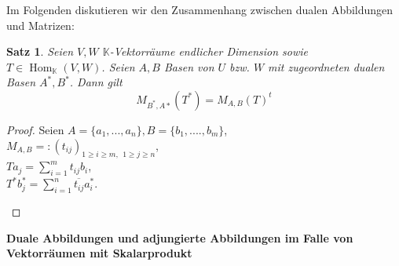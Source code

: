 \documentclass[12pt,a4paper]{article}
\newtheorem{theorem}{Satz}
\theoremstyle{definition}
\theoremstyle{remark}
\renewcommand{\bar}[1]{\overline{#1}}
\DeclareMathOperator{\Hom}{Hom}
\begin{document}
	Im Folgenden diskutieren wir den Zusammenhang zwischen dualen Abbildungen und Matrizen:
	\begin{theorem}
		Seien $V,W$ $\mathbb{K}$-Vektorräume endlicher Dimension sowie $T \in \Hom_{\mathbb{K}}(V,W)$. Seien $A,B$ Basen von $U$ bzw. $W$ mit zugeordneten dualen Basen $A^*, B^*$. Dann gilt
		\begin{equation}
			M_{B^*,A*}(T^*) = M_{A,B}(T)^t
		\end{equation}		 
	\end{theorem}
	\begin{proof}
		Seien $A = \{ a_1,...,a_n \}, B = \{ b_1,....,b_m \}$, \\
		 $M_{A,B} =: (t_{ij})_{ 1 \geq i \geq m, \ \ 1 \geq j \geq n}$, \\ 
		 $T a_j = \sum_{i = 1}^m t_{ij} b_i$,\\
		 $T^* b_j^* = \sum_{i = 1}^n \bar{t_{ij}} a_i^*$.
		\begin{center}
		\end{center}
	\end{proof}
	\textbf{Duale Abbildungen und adjungierte Abbildungen im Falle von Vektorräumen mit Skalarprodukt}
\end{document}
